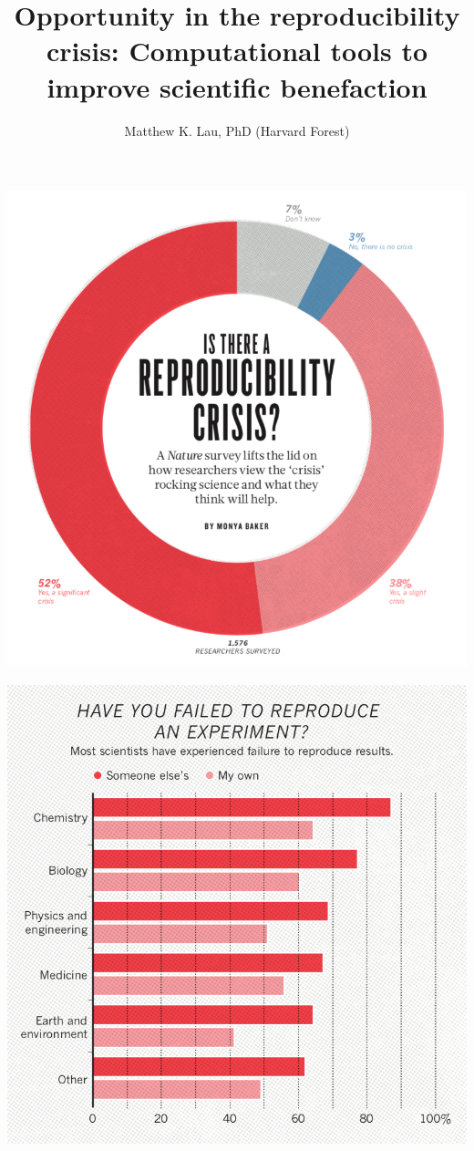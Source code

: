 \documentclass[ignorenonframetext,]{beamer}
\title{Opportunity in the reproducibility crisis: Computational tools to
improve scientific benefaction}
\author{Matthew K. Lau, PhD (Harvard Forest)}
\date{}
\begin{document}
\frame{\titlepage}

\begin{frame}

\end{frame}

\begin{frame}{}
\protect\hypertarget{section}{}

\includegraphics{Baker2016_1.png}

\end{frame}

\begin{frame}{}
\protect\hypertarget{section-1}{}

\includegraphics{Baker2016_2.png}

\end{frame}
\end{document}
